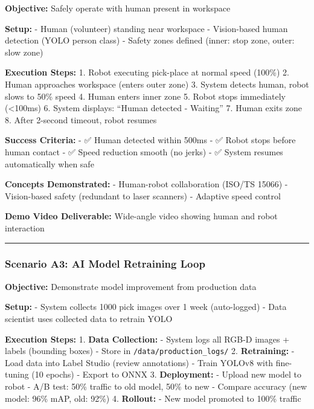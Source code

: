 \documentclass[
]{article}
\begin{document}
\textbf{Objective:} Safely operate with human present in workspace

\textbf{Setup:} - Human (volunteer) standing near workspace -
Vision-based human detection (YOLO person class) - Safety zones defined
(inner: stop zone, outer: slow zone)

\textbf{Execution Steps:} 1. Robot executing pick-place at normal speed
(100\%) 2. Human approaches workspace (enters outer zone) 3. System
detects human, robot slows to 50\% speed 4. Human enters inner zone 5.
Robot stops immediately (\textless100ms) 6. System displays: ``Human
detected - Waiting'' 7. Human exits zone 8. After 2-second timeout,
robot resumes

\textbf{Success Criteria:} - ✅ Human detected within 500ms - ✅ Robot
stops before human contact - ✅ Speed reduction smooth (no jerks) - ✅
System resumes automatically when safe

\textbf{Concepts Demonstrated:} - Human-robot collaboration (ISO/TS
15066) - Vision-based safety (redundant to laser scanners) - Adaptive
speed control

\textbf{Demo Video Deliverable:} Wide-angle video showing human and
robot interaction

\begin{center}\rule{0.5\linewidth}{0.5pt}\end{center}

\hypertarget{scenario-a3-ai-model-retraining-loop}{%
\subsubsection{Scenario A3: AI Model Retraining
Loop}\label{scenario-a3-ai-model-retraining-loop}}

\textbf{Objective:} Demonstrate model improvement from production data

\textbf{Setup:} - System collects 1000 pick images over 1 week
(auto-logged) - Data scientist uses collected data to retrain YOLO

\textbf{Execution Steps:} 1. \textbf{Data Collection:} - System logs all
RGB-D images + labels (bounding boxes) - Store in
\texttt{/data/production\_logs/} 2. \textbf{Retraining:} - Load data
into Label Studio (review annotations) - Train YOLOv8 with fine-tuning
(10 epochs) - Export to ONNX 3. \textbf{Deployment:} - Upload new model
to robot - A/B test: 50\% traffic to old model, 50\% to new - Compare
accuracy (new model: 96\% mAP, old: 92\%) 4. \textbf{Rollout:} - New
model promoted to 100\% traffic
\end{document}
